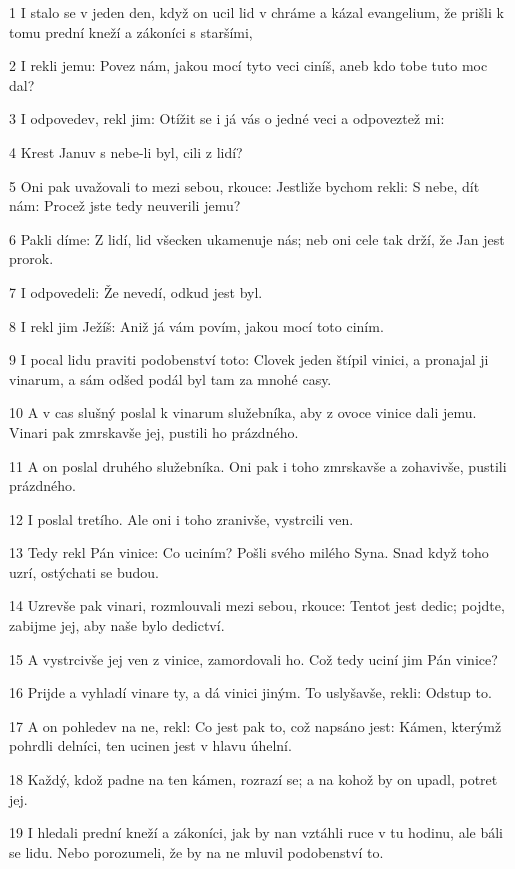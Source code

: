 \par 1 I stalo se v jeden den, když on ucil lid v chráme a kázal evangelium, že prišli k tomu prední kneží a zákoníci s staršími,
\par 2 I rekli jemu: Povez nám, jakou mocí tyto veci ciníš, aneb kdo tobe tuto moc dal?
\par 3 I odpovedev, rekl jim: Otížit se i já vás o jedné veci a odpoveztež mi:
\par 4 Krest Januv s nebe-li byl, cili z lidí?
\par 5 Oni pak uvažovali to mezi sebou, rkouce: Jestliže bychom rekli: S nebe, dít nám: Procež jste tedy neuverili jemu?
\par 6 Pakli díme: Z lidí, lid všecken ukamenuje nás; neb oni cele tak drží, že Jan jest prorok.
\par 7 I odpovedeli: Že nevedí, odkud jest byl.
\par 8 I rekl jim Ježíš: Aniž já vám povím, jakou mocí toto ciním.
\par 9 I pocal lidu praviti podobenství toto: Clovek jeden štípil vinici, a pronajal ji vinarum, a sám odšed podál byl tam za mnohé casy.
\par 10 A v cas slušný poslal k vinarum služebníka, aby z ovoce vinice dali jemu. Vinari pak zmrskavše jej, pustili ho prázdného.
\par 11 A on poslal druhého služebníka. Oni pak i toho zmrskavše a zohavivše, pustili prázdného.
\par 12 I poslal tretího. Ale oni i toho zranivše, vystrcili ven.
\par 13 Tedy rekl Pán vinice: Co uciním? Pošli svého milého Syna. Snad když toho uzrí, ostýchati se budou.
\par 14 Uzrevše pak vinari, rozmlouvali mezi sebou, rkouce: Tentot jest dedic; pojdte, zabijme jej, aby naše bylo dedictví.
\par 15 A vystrcivše jej ven z vinice, zamordovali ho. Což tedy uciní jim Pán vinice?
\par 16 Prijde a vyhladí vinare ty, a dá vinici jiným. To uslyšavše, rekli: Odstup to.
\par 17 A on pohledev na ne, rekl: Co jest pak to, což napsáno jest: Kámen, kterýmž pohrdli delníci, ten ucinen jest v hlavu úhelní.
\par 18 Každý, kdož padne na ten kámen, rozrazí se; a na kohož by on upadl, potret jej.
\par 19 I hledali prední kneží a zákoníci, jak by nan vztáhli ruce v tu hodinu, ale báli se lidu. Nebo porozumeli, že by na ne mluvil podobenství to.
